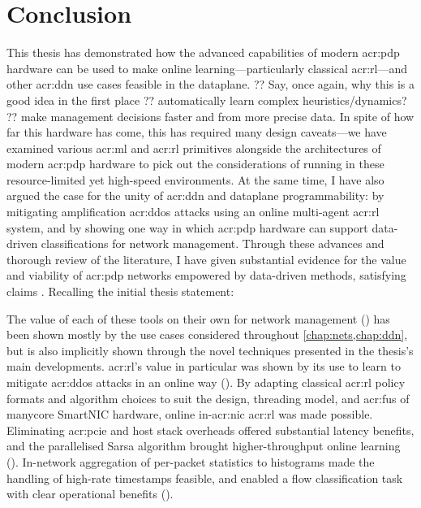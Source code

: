 \chapter{Conclusion}\label{chap:conclusion}
This thesis has demonstrated how the advanced capabilities of modern \gls{acr:pdp} hardware can be used to make online learning---particularly classical \gls{acr:rl}---and other \gls{acr:ddn} use cases feasible in the dataplane.
?? Say, once again, why this is a good idea in the first place
?? automatically learn complex heuristics/dynamics?
?? make management decisions faster and from more precise data.
In spite of how far this hardware has come, this has required many design caveats---we have examined various \gls{acr:ml} and \gls{acr:rl} primitives alongside the architectures of modern \gls{acr:pdp} hardware to pick out the considerations of running in these resource-limited yet high-speed environments.
At the same time, I have also argued the case for the unity of \gls{acr:ddn} and dataplane programmability: by mitigating amplification \gls{acr:ddos} attacks using an online multi-agent \gls{acr:rl} system, and by showing one way in which \gls{acr:pdp} hardware can support data-driven classifications for network management.
%
Through these advances and thorough review of the literature, I have given substantial evidence for the value and viability of \gls{acr:pdp} networks empowered by data-driven methods, satisfying claims .
Recalling the initial thesis statement:
\begin{quotation}
	\noindent
\end{quotation}
The value of each of these tools on their own for network management () has been shown mostly by the use cases considered throughout \cref{chap:nets,chap:ddn}, but is also implicitly shown through the novel techniques presented in the thesis's main developments.
\gls{acr:rl}'s value in particular was shown by its use to learn to mitigate \gls{acr:ddos} attacks in an online way ().
By adapting classical \gls{acr:rl} policy formats and algorithm choices to suit the design, threading model, and \glspl{acr:fu} of manycore SmartNIC hardware, online in-\gls{acr:nic} \gls{acr:rl} was made possible.
Eliminating \gls{acr:pcie} and host stack overheads offered substantial latency benefits, and the parallelised Sarsa algorithm brought higher-throughput online learning ().
In-network aggregation of per-packet statistics to histograms made the handling of high-rate timestamps feasible, and enabled a flow classification task with clear operational benefits ().

